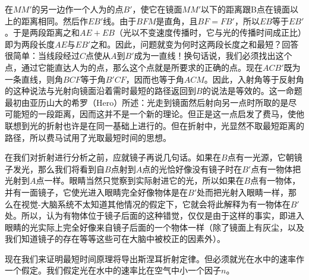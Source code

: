 在$MM'$的另一边作一个人为的点$B'$，使它在镜面$MM'$以下的距离跟B点在镜面以上的距离相同。然后作$EB'$线。由于$BFM$是直角，且$BF=FB'$，所以$EB$等于$EB'$。于是两段距离之和$AE+EB$（光以不变速度传播时，它与光的传播时间成正比）即为两段长度$AE$与$EB'$之和。因此，问题就变为何时这两段长度之和最短？回答很简单：当线段经过$C$点使从$A$到$B'$成为一直线！换句话说，我们必须找出这个点，通过它能直达人为的点，那么这个点就是所要求的正确的点。现在$ACB'$既为一条直线，则角$BCF$等于角$B'CF$，因而也等于角$ACM$。因此，入射角等于反射角的这种说法与光射向镜面沿着需时最短的路径返回到$B$的说法是等效的。这一命题最初由亚历山大的希罗（Hero）所述：光走到镜面然后射向另一点时所取的是尽可能短的一段距离，因而这并不是一个新的理论。但正是这一点启发了费马，使他联想到光的折射也许是在同一基础上进行的。但在折射中，光显然不取最短距离的路径，所以费马试用了光取最短时间的思想。

在我们对折射进行分析之前，应就镜子再说几句话。如果在$B$点有一光源，它朝镜子发光，那么我们将看到自$B$点射到$A$点的光恰好像没有镜子时在$B'$点有一物体把光射到$A$点一样。眼睛当然只觉察到实际射进它的光，所以如果在$B$点有一物体，并有一面镜子，它使光进入眼睛完全好像物体是在$B'$处而把光射入眼睛一样，那么在视觉-大脑系统不太知道其他情况的假定下，它就会将此解释为有一物体在$B'$处。所以，认为有物体位于镜子后面的这种错觉，仅仅是由于这样的事实，即进入眼睛的光实际上完全好像来自镜子后面的一个物体一样（除了镜面上有灰尘，以及我们知道镜子的存在等等这些可在大脑中被校正的因素外）。

现在我们来证明最短时间原理将导出斯涅耳折射定律。但必须就光在水中的速率作一个假定。我们假定光在水中的速率比在空气中小一个因子$n$。

